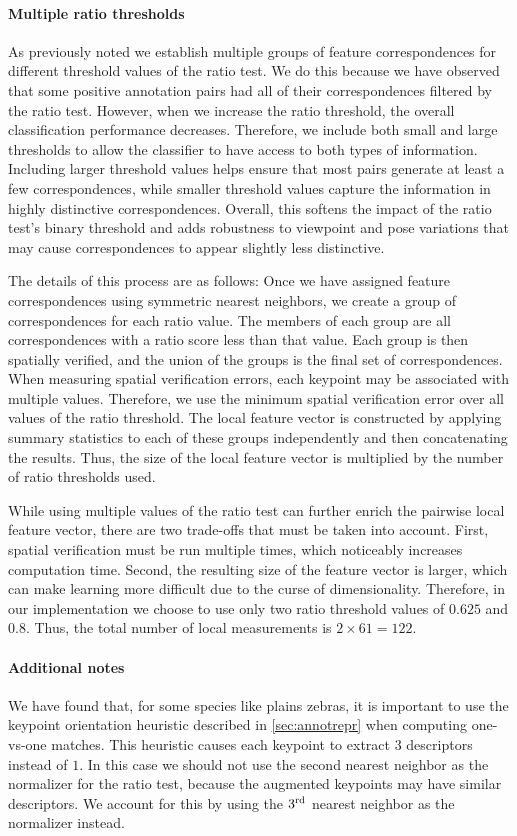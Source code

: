 \paragraph{Multiple ratio thresholds}
As previously noted we establish multiple groups of feature correspondences for different threshold values of the
  ratio test.
We do this because we have observed that some positive annotation pairs had all of their correspondences filtered
  by the ratio test.
However, when we increase the ratio threshold, the overall classification performance decreases.
Therefore, we include both small and large thresholds to allow the classifier to have access to both types of
  information.
Including larger threshold values helps ensure that most pairs generate at least a few correspondences, while
  smaller threshold values capture the information in highly distinctive correspondences.
Overall, this softens the impact of the ratio test's binary threshold and adds robustness to viewpoint and pose
  variations that may cause correspondences to appear slightly less distinctive.

The details of this process are as follows:
Once we have assigned feature correspondences using symmetric nearest neighbors, we create a group of
  correspondences for each ratio value.
The members of each group are all correspondences with a ratio score less than that value.
Each group is then spatially verified, and the union of the groups is the final set of correspondences.
When measuring spatial verification errors, each keypoint may be associated with multiple values.
Therefore, we use the minimum spatial verification error over all values of the ratio threshold.
The local feature vector is constructed by applying summary statistics to each of these groups independently and
  then concatenating the results.
Thus, the size of the local feature vector is multiplied by the number of ratio thresholds used.

While using multiple values of the ratio test can further enrich the pairwise local feature vector, there are two
  trade-offs that must be taken into account.
First, spatial verification must be run multiple times, which noticeably increases computation time.
Second, the resulting size of the feature vector is larger, which can make learning more difficult due to the
  curse of dimensionality.
Therefore, in our implementation we choose to use only two ratio threshold values of $0.625$ and $0.8$.
Thus, the total number of local measurements is $2 \times 61 = 122$.

\paragraph{Additional notes}
We have found that, for some species like plains zebras, it is important to use the keypoint orientation
  heuristic described in \cref{sec:annotrepr} when computing one-vs-one matches.
This heuristic causes each keypoint to extract $3$ descriptors instead of $1$.
In this case we should not use the second nearest neighbor as the normalizer for the ratio test, because the
  augmented keypoints may have similar descriptors.
We account for this by using the $3^{\textrm{rd}}{}$ nearest neighbor as the normalizer instead.

